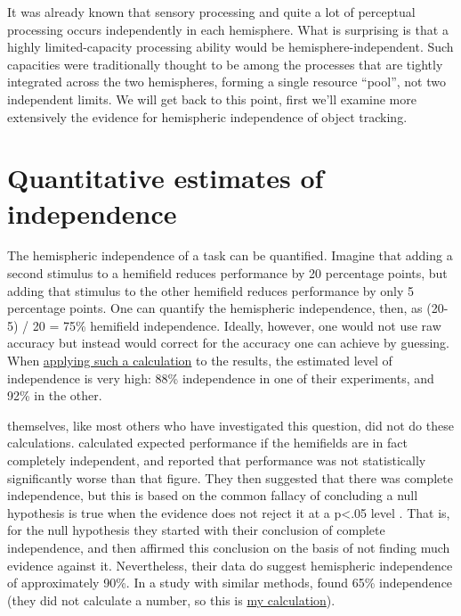 \documentclass[
]{book}
\begin{document}
It was already known that sensory processing and quite a lot of perceptual processing occurs independently in each hemisphere. What is surprising is that a highly limited-capacity processing ability would be hemisphere-independent. Such capacities were traditionally thought to be among the processes that are tightly integrated across the two hemispheres, forming a single resource ``pool'', not two independent limits. We will get back to this point, first we'll examine more extensively the evidence for hemispheric independence of object tracking.

\hypertarget{quantitative-estimates-of-independence}{%
\section{Quantitative estimates of independence}\label{quantitative-estimates-of-independence}}

The hemispheric independence of a task can be quantified. Imagine that adding a second stimulus to a hemifield reduces performance by 20 percentage points, but adding that stimulus to the other hemifield reduces performance by only 5 percentage points. One can quantify the hemispheric independence, then, as (20-5) / 20 = 75\% hemifield independence. Ideally, however, one would not use raw accuracy but instead would correct for the accuracy one can achieve by guessing. When \href{https://github.com/alexholcombe/tracking-review/blob/main/twoBrainsOrOne.Rmd}{applying such a calculation} to the \citet{alvarezIndependentResourcesAttentional2005} results, the estimated level of independence is very high: 88\% independence in one of their experiments, and 92\% in the other.

\citet{alvarezIndependentResourcesAttentional2005} themselves, like most others who have investigated this question, did not do these calculations. \citet{alvarezIndependentResourcesAttentional2005} calculated expected performance if the hemifields are in fact completely independent, and reported that performance was not statistically significantly worse than that figure. They then suggested that there was complete independence, but this is based on the common fallacy of concluding a null hypothesis is true when the evidence does not reject it at a p\textless.05 level \citep{aczelQuantifyingSupportNull2018}. That is, for the null hypothesis they started with their conclusion of complete independence, and then affirmed this conclusion on the basis of not finding much evidence against it. Nevertheless, their data do suggest hemispheric independence of approximately 90\%. In a study with similar methods, \citet{hudsonHemifieldEffectsMultiple2012} found 65\% independence (they did not calculate a number, so this is \href{https://github.com/alexholcombe/tracking-review/blob/main/twoBrainsOrOne.Rmd}{my calculation}).
\end{document}
